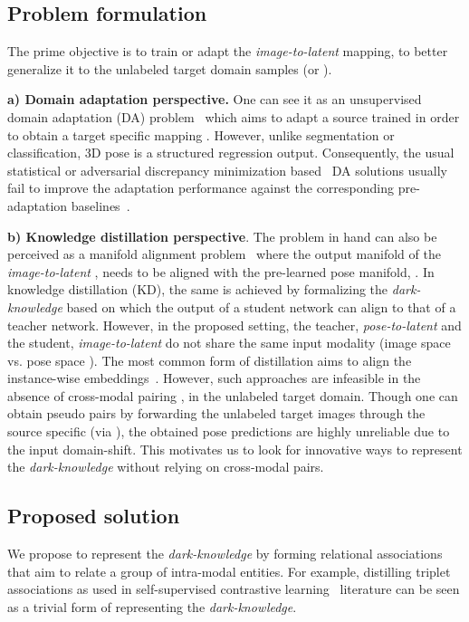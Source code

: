 \documentclass{article}
\begin{document}
\vspace{-2mm}
\subsection{Problem formulation}
\vspace{-2.5mm}
The prime objective is to train or adapt the \textit{image-to-latent} mapping,  to 
better generalize it to the unlabeled target domain samples (\ie  or ). 



\textbf{a) Domain adaptation perspective.} One can see it as an unsupervised domain adaptation (DA) problem~\cite{ganin2015unsupervised, saenko2010adapting} which aims to adapt a source trained  in order to obtain a target specific mapping . However, unlike segmentation or classification, 3D pose is a structured regression output. Consequently, the usual statistical or adversarial discrepancy minimization based~\cite{tzeng2017adversarial,long2015learning} DA solutions usually fail to improve the adaptation performance against the corresponding pre-adaptation baselines~\cite{NIPS2019_9454}. 

\textbf{b) Knowledge distillation perspective}. The problem in hand can also be perceived as a manifold alignment problem~\cite{wang2011heterogeneous} where the output manifold of the \textit{image-to-latent} , needs to be aligned with the pre-learned pose manifold, . In knowledge distillation (KD), the same is achieved by formalizing the \textit{dark-knowledge} based on which the output of a student network can align to that of a teacher network. However, in the proposed setting, the teacher, \textit{pose-to-latent}  and the student, \textit{image-to-latent}  do not share the same input modality (\ie image space  vs. pose space ). The most common form of distillation aims to align the instance-wise embeddings~\cite{hinton2015distilling,romero2014fitnets}. However, such approaches are infeasible in the absence of cross-modal pairing \ie,  in the unlabeled target domain. Though one can obtain pseudo  pairs by forwarding the unlabeled target images through the source specific  (via ), the obtained pose predictions are highly unreliable due to the input domain-shift. This motivates us to look for innovative ways to represent the \textit{dark-knowledge} without relying on cross-modal pairs. 

\vspace{-2mm}
\subsection{Proposed solution} \label{sec:proposed_solution}
\vspace{-2.5mm}
We propose to represent the \textit{dark-knowledge} by forming relational associations that aim to relate a group of intra-modal entities. For example, distilling triplet associations as used in self-supervised contrastive learning~\cite{chen2020simple, misra2020self} literature can be seen as a trivial form of representing the \textit{dark-knowledge}. 
\end{document}
